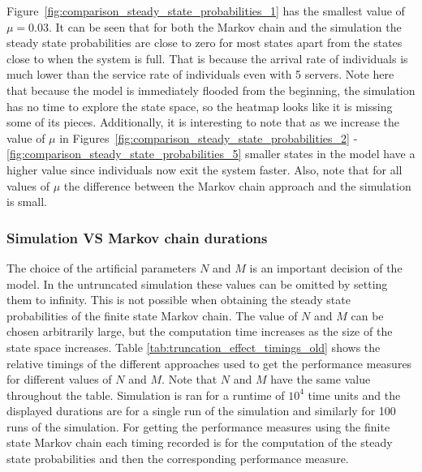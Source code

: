 Figure~\ref{fig:comparison_steady_state_probabilities_1} has the smallest
value of \(\mu = 0.03\).
It can be seen that for both the Markov chain and the simulation the steady
state probabilities are close to zero for most states apart from the
states close to when the system is full.
That is because the arrival rate of individuals is much lower than the service
rate of individuals even with 5 servers.
Note here that because the model is immediately flooded from the beginning, the
simulation has no time to explore the state space, so the heatmap looks like
it is missing some of its pieces.
Additionally, it is interesting to note that as we increase the value of \(\mu\)
in Figures~\ref{fig:comparison_steady_state_probabilities_2} -
\ref{fig:comparison_steady_state_probabilities_5} smaller states in the model
have a higher value since individuals now exit the system faster.
Also, note that for all values of \(\mu\) the difference between the Markov
chain approach and the simulation is small.


\subsubsection{Simulation VS Markov chain durations}

The choice of the artificial parameters \(N\) and \(M\) is an important 
decision of the model.
In the untruncated simulation these values can be omitted by setting them to
infinity.
This is not possible when obtaining the steady state probabilities of the
finite state Markov chain.
The value of \(N\) and \(M\) can be chosen arbitrarily large, but the
computation time increases as the size of the state space increases.
Table \ref{tab:truncation_effect_timings_old} shows the relative timings of the
different approaches used to get the performance measures for different values
of \(N\) and \(M\).
Note that \(N\) and \(M\) have the same value throughout the table.
Simulation is ran for a runtime of \(10^4\) time units and the displayed
durations are for a single run of the simulation and similarly for 100 runs of
the simulation.
For getting the performance measures using the finite state Markov chain each
timing recorded is for the computation of the steady state probabilities and
then the corresponding performance measure.

